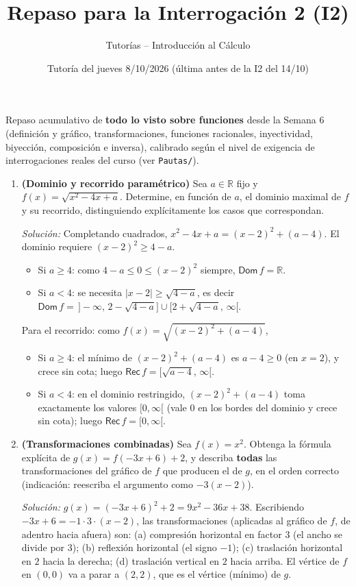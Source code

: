 \documentclass[11pt]{article}
\title{Repaso para la Interrogación 2 (I2)}
\author{Tutorías -- Introducción al Cálculo}
\date{Tutoría del jueves 8/10/2026 (última antes de la I2 del 14/10)}
\begin{document}
\maketitle

Repaso acumulativo de \textbf{todo lo visto sobre funciones} desde la Semana 6 (definición y
gráfico, transformaciones, funciones racionales, inyectividad, biyección, composición e inversa),
calibrado según el nivel de exigencia de interrogaciones reales del curso (ver \texttt{Pautas/}).

\begin{enumerate}[label=\arabic*.]

\item \textbf{(Dominio y recorrido paramétrico)} Sea $a\in\mathbb{R}$ fijo y
$f(x) = \sqrt{x^2 - 4x + a}$. Determine, en función de $a$, el dominio maximal de $f$ y su
recorrido, distinguiendo explícitamente los casos que correspondan.

\textit{Solución:} Completando cuadrados, $x^2-4x+a = (x-2)^2+(a-4)$. El dominio requiere
$(x-2)^2 \ge 4-a$.
\begin{itemize}
\item Si $a\ge4$: como $4-a\le0\le(x-2)^2$ siempre, $\mathsf{Dom}\,f=\mathbb{R}$.
\item Si $a<4$: se necesita $|x-2|\ge\sqrt{4-a}$, es decir
$\mathsf{Dom}\,f = \,]-\infty,\,2-\sqrt{4-a}] \cup [2+\sqrt{4-a},\,\infty[$.
\end{itemize}
Para el recorrido: como $f(x)=\sqrt{(x-2)^2+(a-4)}$,
\begin{itemize}
\item Si $a\ge4$: el mínimo de $(x-2)^2+(a-4)$ es $a-4\ge0$ (en $x=2$), y crece sin cota; luego
$\mathsf{Rec}\,f = [\sqrt{a-4},\,\infty[$.
\item Si $a<4$: en el dominio restringido, $(x-2)^2+(a-4)$ toma exactamente los valores
$[0,\infty[$ (vale $0$ en los bordes del dominio y crece sin cota); luego $\mathsf{Rec}\,f =
[0,\infty[$.
\end{itemize}

\item \textbf{(Transformaciones combinadas)} Sea $f(x) = x^2$. Obtenga la fórmula explícita de
$g(x) = f(-3x+6) + 2$, y describa \textbf{todas} las transformaciones del gráfico de $f$ que
producen el de $g$, en el orden correcto (indicación: reescriba el argumento como
$-3(x-2)$).

\textit{Solución:} $g(x) = (-3x+6)^2+2 = 9x^2-36x+38$. Escribiendo $-3x+6 = -1\cdot3\cdot(x-2)$,
las transformaciones (aplicadas al gráfico de $f$, de adentro hacia afuera) son: (a) compresión
horizontal en factor $3$ (el ancho se divide por $3$); (b) reflexión horizontal (el signo $-1$);
(c) traslación horizontal en $2$ hacia la derecha; (d) traslación vertical en $2$ hacia arriba.
El vértice de $f$ en $(0,0)$ va a parar a $(2,2)$, que es el vértice (mínimo) de $g$.


\end{enumerate}
\end{document}
